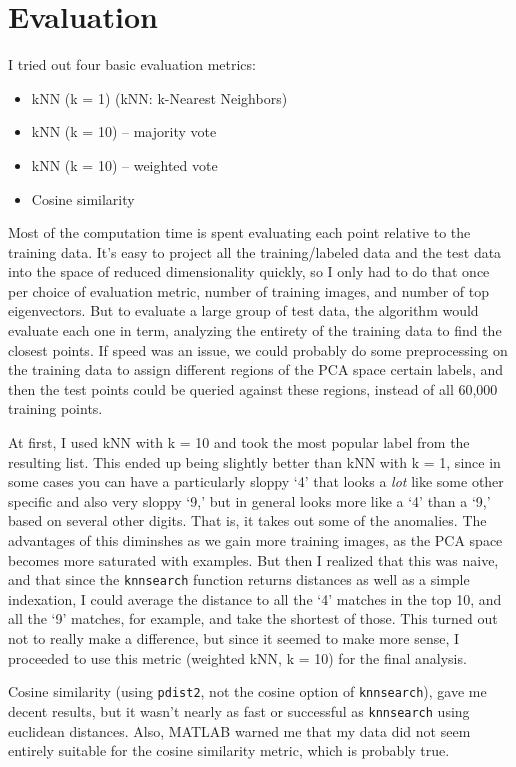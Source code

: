 \documentclass[11pt]{report}
\begin{document}
\section{Evaluation}

I tried out four basic evaluation metrics:

\begin{itemize}
  \item kNN (k = 1) \hfill (kNN: k-Nearest Neighbors)
  \item kNN (k = 10) -- majority vote
  \item kNN (k = 10) -- weighted vote
  \item Cosine similarity
\end{itemize}

Most of the computation time is spent evaluating each point relative to the training data. It's easy to project all the training/labeled data and the test data into the space of reduced dimensionality quickly, so I only had to do that once per choice of evaluation metric, number of training images, and number of top eigenvectors. But to evaluate a large group of test data, the algorithm would evaluate each one in term, analyzing the entirety of the training data to find the closest points.
If speed was an issue, we could probably do some preprocessing on the training data to assign different regions of the PCA space certain labels, and then the test points could be queried against these regions, instead of all 60,000 training points.

At first, I used kNN with k = 10 and took the most popular label from the resulting list. This ended up being slightly better than kNN with k = 1, since in some cases you can have a particularly sloppy `4' that looks a \emph{lot} like some other specific and also very sloppy `9,' but in general looks more like a `4' than a `9,' based on several other digits. That is, it takes out some of the anomalies. The advantages of this diminshes as we gain more training images, as the PCA space becomes more saturated with examples. But then I realized that this was naive, and that since the \texttt{knnsearch} function returns distances as well as a simple indexation, I could average the distance to all the `4' matches in the top 10, and all the `9' matches, for example, and take the shortest of those. This turned out not to really make a difference, but since it seemed to make more sense, I proceeded to use this metric (weighted kNN, k = 10) for the final analysis.

Cosine similarity (using \texttt{pdist2}, not the cosine option of \texttt{knnsearch}), gave me decent results, but it wasn't nearly as fast or successful as \texttt{knnsearch} using euclidean distances. Also, MATLAB warned me that my data did not seem entirely suitable for the cosine similarity metric, which is probably true.
\end{document}
